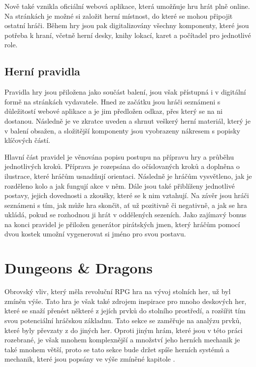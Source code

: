 Nově také vznikla oficiální webová aplikace, která umožňuje hru hrát plně online. Na stránkách je možné si založit herní místnost, do které se mohou připojit ostatní hráči. Během hry jsou pak digitalizovány všechny komponenty, které jsou potřeba k hraní, včetně herní desky, knihy lokací, karet a počítadel pro jednotlivé role. \cite{fw_remote_app}

\subsection{Herní pravidla}
\label{subsec:fw_rules}

Pravidla hry  jsou přiložena jako součást balení, jsou však přístupná i v digitální formě na stránkách vydavatele. Hned ze začátku jsou hráči seznámeni s důležitostí webové aplikace a je jim předložen odkaz, přes který se na ni dostanou. Následně je ve zkratce uveden a shrnut veškerý herní materiál, který je v balení obsažen, a složitější komponenty jsou vyobrazeny nákresem s popisky klíčových částí.

Hlavní část pravidel je věnována popisu postupu na přípravu hry a průběhu jednotlivých kroků. Příprava je rozepsána do očíslovaných kroků a doplněna o ilustrace, které hráčům usnadňují orientaci. Následně je hráčům vysvětleno, jak je rozděleno kolo a jak fungují akce v něm. Dále jsou také přiblíženy jednotlivé postavy, jejich dovednosti a zkoušky, které se k nim vztahují. Na závěr jsou hráči seznámeni s tím, jak může hra skončit, ať už pozitivně či negativně, a jak se hra ukládá, pokud se rozhodnou ji hrát v oddělených sezeních. Jako zajímavý bonus na konci pravidel je přiložen generátor pirátských jmen, který hráčům pomocí dvou kostek umožní vygenerovat si jméno pro svou postavu.



\section{Dungeons \& Dragons}
\label{sec:dungeons_and_dragons}

Obrovský vliv, který měla revoluční RPG hra  na vývoj stolních her, už byl zmíněn výše. Tato hra je však také zdrojem inspirace pro mnoho deskových her, které se snaží přenést některé z jejích prvků do stolního prostředí, a rozšířit tím svou potenciální hráčskou základnu. Tato sekce se zaměřuje na analýzu prvků, které byly převzaty z \dnd{} do jiných her. Oproti jiným hrám, které jsou v této práci rozebrané, je však \dnd{} mnohem komplexnější a množství jeho herních mechanik je také mnohem větší, proto se tato sekce bude držet spíše herních systémů a mechanik, které jsou popsány ve výše zmíněné kapitole \textit{}.


